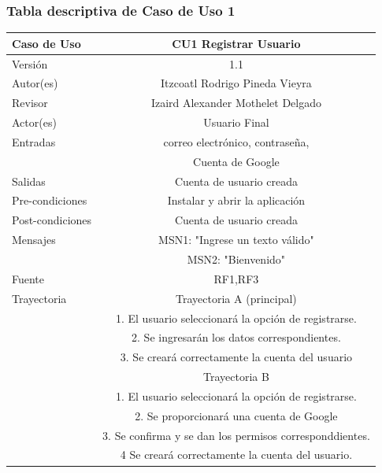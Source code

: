 \documentclass{article}
\begin{document}
\subsubsection{Tabla descriptiva de Caso de Uso 1}
\begin{tabular}{|M{5cm}|c|}
\hline
Caso de Uso & CU1 Registrar Usuario\\ \hline
Versión & 1.1\\ \hline
Autor(es) & Itzcoatl Rodrigo Pineda Vieyra\\ \hline
Revisor & Izaird Alexander Mothelet Delgado \\ \hline
Actor(es) & Usuario Final \\ \hline
Entradas & correo electrónico, contraseña, \\ & Cuenta de Google \\ \hline
Salidas & Cuenta de usuario creada \\ \hline
Pre-condiciones & Instalar y abrir la aplicación \\ \hline
Post-condiciones & Cuenta de usuario creada\\ \hline
Mensajes & MSN1: "Ingrese un texto válido"\\
		 & MSN2: "Bienvenido"\\ \hline
Fuente & RF1,RF3 \\ \hline	
	Trayectoria & Trayectoria A (principal)\\
		& 1.   El usuario seleccionará la opción de registrarse.\\
		& 2.   Se ingresarán los datos correspondientes.\\
		& 3.   Se creará correctamente la cuenta del usuario\\
	& Trayectoria B\\
	& 1.   El usuario seleccionará la opción de registrarse.\\
	& 2.   Se proporcionará una cuenta de Google\\
	& 3.   Se confirma y se dan los permisos corresponddientes.\\
	& 4   Se creará correctamente la cuenta del usuario.\\ \hline
\end{tabular}
\end{document}
